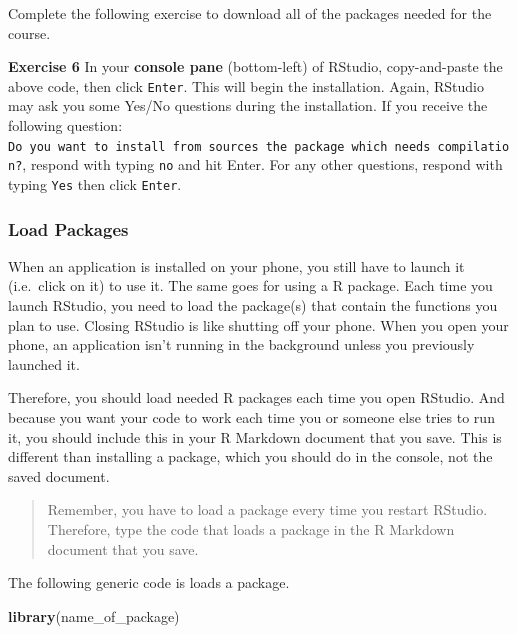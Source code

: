 \documentclass[
]{book}
\makeatletter
\newenvironment{Shaded}{\begin{snugshade}}{\end{snugshade}}
\newcommand{\FunctionTok}[1]{\textcolor[rgb]{0.27,0.27,0.27}{\textbf{#1}}}
\newcommand{\NormalTok}[1]{#1}
\newenvironment{kframe}{%
\medskip{}
\setlength{\fboxsep}{.8em}
 \def\at@end@of@kframe{}%
 \ifinner\ifhmode%
  \def\at@end@of@kframe{\end{minipage}}%
  \begin{minipage}{\columnwidth}%
 \fi\fi%
 \def\FrameCommand##1{\hskip\@totalleftmargin \hskip-\fboxsep
 \colorbox{shadecolor}{##1}\hskip-\fboxsep
     \hskip-\linewidth \hskip-\@totalleftmargin \hskip\columnwidth}%
 \MakeFramed {\advance\hsize-\width
   \@totalleftmargin\z@ \linewidth\hsize
   \@setminipage}}%
 {\par\unskip\endMakeFramed%
 \at@end@of@kframe}
\renewenvironment{Shaded}{\begin{kframe}}{\end{kframe}}
\newenvironment{rmdblock}[1]
  {\begin{shaded*}
  }
  {\end{shaded*}
  }
\newenvironment{learncheck}
  {\begin{rmdblock}{warning}}
  {\end{rmdblock}}
\makeatother
\begin{document}
Complete the following exercise to download all of the packages needed for the course.

\begin{learncheck}
\textbf{Exercise 6} In your \textbf{console pane} (bottom-left) of
RStudio, copy-and-paste the above code, then click \texttt{Enter}. This
will begin the installation. Again, RStudio may ask you some Yes/No
questions during the installation. If you receive the following
question:
\texttt{Do\ you\ want\ to\ install\ from\ sources\ the\ package\ which\ needs\ compilation?},
respond with typing \texttt{no} and hit Enter. For any other questions,
respond with typing \texttt{Yes} then click \texttt{Enter}.
\end{learncheck}

\hypertarget{load-packages}{%
\subsubsection*{Load Packages}\label{load-packages}}


When an application is installed on your phone, you still have to launch it (i.e.~click on it) to use it. The same goes for using a R package. Each time you launch RStudio, you need to load the package(s) that contain the functions you plan to use. Closing RStudio is like shutting off your phone. When you open your phone, an application isn't running in the background unless you previously launched it.

Therefore, you should load needed R packages each time you open RStudio. And because you want your code to work each time you or someone else tries to run it, you should include this in your R Markdown document that you save. This is different than installing a package, which you should do in the console, not the saved document.

\begin{quote}
Remember, you have to load a package every time you restart RStudio. Therefore, type the code that loads a package in the R Markdown document that you save.
\end{quote}

The following generic code is loads a package.

\begin{Shaded}
\begin{Highlighting}[]
\FunctionTok{library}\NormalTok{(name\_of\_package)}
\end{Highlighting}
\end{Shaded}
\end{document}
